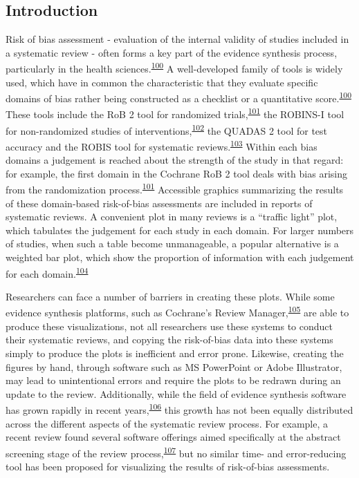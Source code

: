 \documentclass[a4paper, twoside]{templates/ociamthesis}
\begin{document}
\hypertarget{introduction-2}{%
\subsection{Introduction}\label{introduction-2}}

Risk of bias assessment - evaluation of the internal validity of studies included in a systematic review - often forms a key part of the evidence synthesis process, particularly in the health sciences.\textsuperscript{\protect\hyperlink{ref-cochranechpt7}{100}} A well-developed family of tools is widely used, which have in common the characteristic that they evaluate specific domains of bias rather being constructed as a checklist or a quantitative score.\textsuperscript{\protect\hyperlink{ref-cochranechpt7}{100}} These tools include the RoB 2 tool for randomized trials,\textsuperscript{\protect\hyperlink{ref-sterne2019rob}{101}} the ROBINS-I tool for non-randomized studies of interventions,\textsuperscript{\protect\hyperlink{ref-sterne2016robins}{102}} the QUADAS 2 tool for test accuracy and the ROBIS tool for systematic reviews.\textsuperscript{\protect\hyperlink{ref-whiting2011quadas}{103}} Within each bias domains a judgement is reached about the strength of the study in that regard: for example, the first domain in the Cochrane RoB 2 tool deals with bias arising from the randomization process.\textsuperscript{\protect\hyperlink{ref-sterne2019rob}{101}} Accessible graphics summarizing the results of these domain-based risk-of-bias assessments are included in reports of systematic reviews. A convenient plot in many reviews is a ``traffic light'' plot, which tabulates the judgement for each study in each domain. For larger numbers of studies, when such a table become unmanageable, a popular alternative is a weighted bar plot, which show the proportion of information with each judgement for each domain.\textsuperscript{\protect\hyperlink{ref-higgins2008assessing}{104}}

Researchers can face a number of barriers in creating these plots. While some evidence synthesis platforms, such as Cochrane's Review Manager,\textsuperscript{\protect\hyperlink{ref-cochrane2014review}{105}} are able to produce these visualizations, not all researchers use these systems to conduct their systematic reviews, and copying the risk-of-bias data into these systems simply to produce the plots is inefficient and error prone. Likewise, creating the figures by hand, through software such as MS PowerPoint or Adobe Illustrator, may lead to unintentional errors and require the plots to be redrawn during an update to the review. Additionally, while the field of evidence synthesis software has grown rapidly in recent years,\textsuperscript{\protect\hyperlink{ref-marshall2015systematic}{106}} this growth has not been equally distributed across the different aspects of the systematic review process. For example, a recent review found several software offerings aimed specifically at the abstract screening stage of the review process,\textsuperscript{\protect\hyperlink{ref-harrison2020software}{107}} but no similar time- and error-reducing tool has been proposed for visualizing the results of risk-of-bias assessments.
\end{document}
